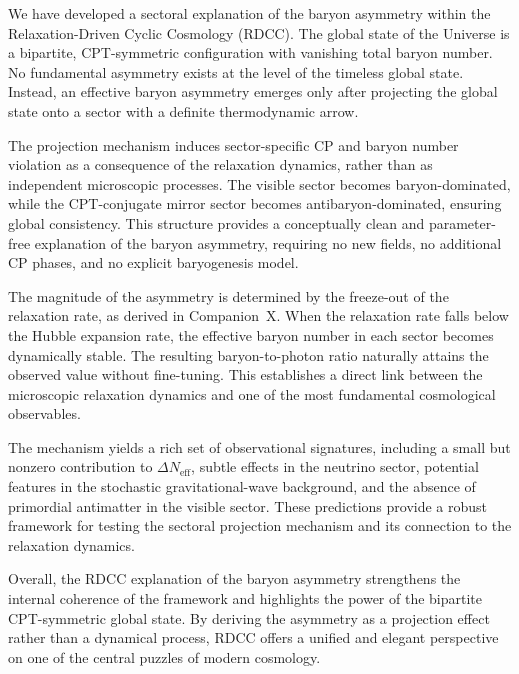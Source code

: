 \documentclass[11pt,a4paper]{article}
\begin{document}
We have developed a sectoral explanation of the baryon asymmetry within the
Relaxation-Driven Cyclic Cosmology (RDCC). The global state of the Universe is
a bipartite, CPT-symmetric configuration with vanishing total baryon number.
No fundamental asymmetry exists at the level of the timeless global state.
Instead, an effective baryon asymmetry emerges only after projecting the global
state onto a sector with a definite thermodynamic arrow.

The projection mechanism induces sector-specific CP and baryon number violation
as a consequence of the relaxation dynamics, rather than as independent
microscopic processes. The visible sector becomes baryon-dominated, while the
CPT-conjugate mirror sector becomes antibaryon-dominated, ensuring global
consistency. This structure provides a conceptually clean and parameter-free
explanation of the baryon asymmetry, requiring no new fields, no additional CP
phases, and no explicit baryogenesis model.

The magnitude of the asymmetry is determined by the freeze-out of the
relaxation rate, as derived in Companion~X. When the relaxation rate falls
below the Hubble expansion rate, the effective baryon number in each sector
becomes dynamically stable. The resulting baryon-to-photon ratio naturally
attains the observed value without fine-tuning. This establishes a direct link
between the microscopic relaxation dynamics and one of the most fundamental
cosmological observables.

The mechanism yields a rich set of observational signatures, including a small
but nonzero contribution to $\Delta N_{\mathrm{eff}}$, subtle effects in the
neutrino sector, potential features in the stochastic gravitational-wave
background, and the absence of primordial antimatter in the visible sector.
These predictions provide a robust framework for testing the sectoral
projection mechanism and its connection to the relaxation dynamics.

Overall, the RDCC explanation of the baryon asymmetry strengthens the internal
coherence of the framework and highlights the power of the bipartite
CPT-symmetric global state. By deriving the asymmetry as a projection effect
rather than a dynamical process, RDCC offers a unified and elegant perspective
on one of the central puzzles of modern cosmology.



\end{document}
